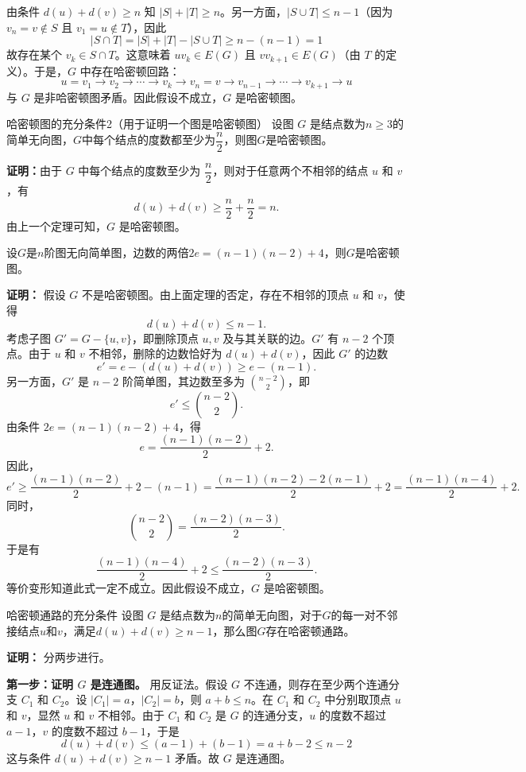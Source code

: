 由条件 $d(u) + d(v) \ge n$ 知 $|S| + |T| \ge n$。另一方面，$|S \cup T| \le n-1$（因为 $v_n = v \notin S$ 且 $v_1 = u \notin T$），因此
\[
|S \cap T| = |S| + |T| - |S \cup T| \ge n - (n-1) = 1
\]
故存在某个 $v_k \in S \cap T$。这意味着 $uv_k \in E(G)$ 且 $v v_{k+1} \in E(G)$（由 $T$ 的定义）。于是，$G$ 中存在哈密顿回路：
\[
u = v_1 \to v_2 \to \cdots \to v_{k} \to v_n = v \to v_{n-1} \to \cdots \to v_{k+1} \to u
\]
与 $G$ 是非哈密顿图矛盾。因此假设不成立，$G$ 是哈密顿图。
\begin{theorem}{哈密顿图的充分条件2（用于证明一个图是哈密顿图）}{}
设图 $G$ 是结点数为$n\geqslant3$的简单无向图，$G$中每个结点的度数都至少为$\dfrac{n}2$，则图$G$是哈密顿图。
\end{theorem}
\textbf{证明：}由于 $G$ 中每个结点的度数至少为 $\dfrac{n}{2}$，则对于任意两个不相邻的结点 $u$ 和 $v$，有
    \[
    d(u) + d(v) \geqslant \frac{n}{2} + \frac{n}{2} = n.
    \]
由上一个定理可知，$G$ 是哈密顿图。
\begin{example}{}{}
    设$G$是$n$阶图无向简单图，边数的两倍$2e=(n-1)(n-2)+4$，则$G$是哈密顿图。
\end{example}
\textbf{证明：} 假设 $G$ 不是哈密顿图。由上面定理的否定，存在不相邻的顶点 $u$ 和 $v$，使得
    \[
    d(u) + d(v) \le n-1.
    \]
    考虑子图 $G' = G - \{u, v\}$，即删除顶点 $u, v$ 及与其关联的边。$G'$ 有 $n-2$ 个顶点。由于 $u$ 和 $v$ 不相邻，删除的边数恰好为 $d(u) + d(v)$，因此 $G'$ 的边数
    \[
    e' = e - (d(u) + d(v)) \ge e - (n-1).
    \]
    另一方面，$G'$ 是 $n-2$ 阶简单图，其边数至多为 $\binom{n-2}{2}$，即
    \[
    e' \le \binom{n-2}{2}.
    \]
    由条件 $2e = (n-1)(n-2) + 4$，得
    \[
    e = \frac{(n-1)(n-2)}{2} + 2.
    \]
    因此，
    \[
    e' \ge \frac{(n-1)(n-2)}{2} + 2 - (n-1) = \frac{(n-1)(n-2) - 2(n-1)}{2} + 2 = \frac{(n-1)(n-4)}{2} + 2.
    \]
    同时，
    \[
    \binom{n-2}{2} = \frac{(n-2)(n-3)}{2}.
    \]
    于是有
    \[
    \frac{(n-1)(n-4)}{2} + 2 \le \frac{(n-2)(n-3)}{2}.
    \]
    等价变形知道此式一定不成立。因此假设不成立，$G$ 是哈密顿图。
\begin{theorem}{哈密顿通路的充分条件}{}
    设图 $G$ 是结点数为$n$的简单无向图，对于$G$的每一对不邻接结点$u$和$v$，满足$d(u)+d(v)\geqslant n-1$，那么图$G$存在哈密顿通路。
\end{theorem}
\textbf{证明：}
    分两步进行。

    \textbf{第一步：证明 $G$ 是连通图。}
    用反证法。假设 $G$ 不连通，则存在至少两个连通分支 $C_1$ 和 $C_2$。设 $|C_1| = a$，$|C_2| = b$，则 $a + b \le n$。在 $C_1$ 和 $C_2$ 中分别取顶点 $u$ 和 $v$，显然 $u$ 和 $v$ 不相邻。由于 $C_1$ 和 $C_2$ 是 $G$ 的连通分支，$u$ 的度数不超过 $a-1$，$v$ 的度数不超过 $b-1$，于是
    \[
    d(u) + d(v) \le (a-1) + (b-1) = a + b - 2 \le n-2
    \]
    这与条件 $d(u) + d(v) \ge n-1$ 矛盾。故 $G$ 是连通图。

